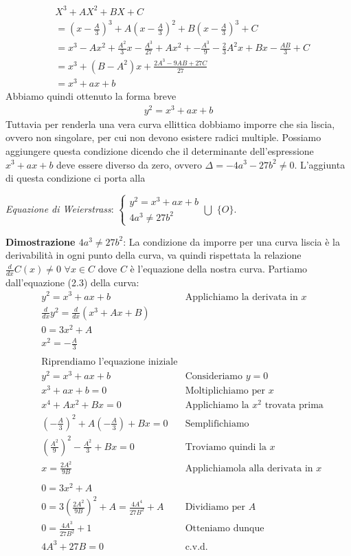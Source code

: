 \documentclass[a4paper,12pt]{tesiinfo}
\newcommand\ddfrac[2]{\frac{\displaystyle #1}{\displaystyle #2}}
\begin{document}
\begin{align*}
&X^3 + AX^2 + BX + C 
\\
&=\left(x- \ddfrac{A}{3} \right )^3 +A\left ( x - \ddfrac{A}{3} \right )^2 + B\left (x - \ddfrac{A}{3} \right )^3 +C
\\
&= x^3-Ax^2 + \ddfrac{A^2}{3}x - \ddfrac{A^3}{27} + Ax^2 + - \ddfrac{A^3}{9} -\ddfrac{2}{3}A^2x + Bx - \ddfrac{AB}{3} +C
\\
&= x^3 + (B-A^2)x + \ddfrac{2A^3-9AB+27C}{27}
\\
&= x^3 + ax+b
\end{align*}
Abbiamo quindi ottenuto la forma breve
\begin{gather}
y^2 = x^3 + ax+b
\end{gather}
Tuttavia per renderla una vera curva ellittica dobbiamo imporre che sia liscia, ovvero non singolare, per cui non devono esistere radici multiple. Possiamo aggiungere questa condizione dicendo che il determinante dell'espressione $x^3 + ax+b$ deve essere diverso da zero, ovvero $\Delta = -4a^3 - 27b^2 \ne 0$. L'aggiunta di questa condizione ci porta alla
\begin{center}
\textit{Equazione di Weierstrass}:
$\begin{cases}
y^2 = x^3 + ax+b\\
4a^3 \ne 27b^2\end{cases}
\bigcup $ $\{O\}$.\\
\end{center}
\textbf{Dimostrazione $4a^3 \ne 27b^2$}: La condizione da imporre per una curva liscia \`e la derivabilit\`a in ogni punto della curva, va quindi rispettata la relazione\\ $\ddfrac{d}{dx}C(x) \ne 0$ $ \forall x \in C$ dove $C$ \`e l'equazione della nostra curva. Partiamo dall'equazione (2.3) della curva: 
\begin{align*}
&y^2 = x^3 + ax+b &\text{Applichiamo la derivata in $x$}\\
&\ddfrac{d}{dx}y^2 = \ddfrac{d}{dx}(x^3 +Ax+B)\\
&0 = 3x^2 +A\\
&x^2 = -\ddfrac{A}{3}\\
\\
&\text{Riprendiamo l'equazione iniziale}\\
&y^2 = x^3 + ax+b &\text{Consideriamo $y=0$}\\
&x^3 + ax+b = 0 &\text{Moltiplichiamo per $x$}\\
&x^4 + Ax^2+Bx = 0 &\text{Applichiamo la $x^2$ trovata prima}\\
&(-\ddfrac{A}{3})^2 + A(-\ddfrac{A}{3})+Bx = 0 &\text{Semplifichiamo}\\
&(\ddfrac{A^2}{9})^2 - \ddfrac{A^2}{3}+Bx = 0 &\text{Troviamo quindi la $x$}\\
&x = \ddfrac{2A^2}{9B}
&\text{Applichiamola alla derivata in $x$}\\
\\
&0 = 3x^2 +A\\
&0 = 3(\ddfrac{2A^2}{9B})^2 +A = \ddfrac{4A^4}{27B^2} +A &\text{Dividiamo per $A$}\\
&0 = \ddfrac{4A^3}{27B^2} +1 &\text{Otteniamo dunque}\\
&4A^3+27B = 0 &\text{c.v.d.}
\end{align*}
\end{document}
